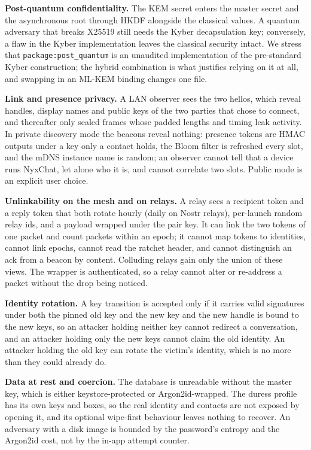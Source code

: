 \documentclass[conference]{IEEEtran}
\begin{document}
\textbf{Post-quantum confidentiality.} The KEM secret enters the master secret and the asynchronous root through HKDF alongside the classical values. A quantum adversary that breaks X25519 still needs the Kyber decapsulation key; conversely, a flaw in the Kyber implementation leaves the classical security intact. We stress that \texttt{package:post\_quantum} is an unaudited implementation of the pre-standard Kyber construction; the hybrid combination is what justifies relying on it at all, and swapping in an ML-KEM binding changes one file.

\textbf{Link and presence privacy.} A LAN observer sees the two hellos, which reveal handles, display names and public keys of the two parties that chose to connect, and thereafter only sealed frames whose padded lengths and timing leak activity. In private discovery mode the beacons reveal nothing: presence tokens are HMAC outputs under a key only a contact holds, the Bloom filter is refreshed every slot, and the mDNS instance name is random; an observer cannot tell that a device runs NyxChat, let alone who it is, and cannot correlate two slots. Public mode is an explicit user choice.

\textbf{Unlinkability on the mesh and on relays.} A relay sees a recipient token and a reply token that both rotate hourly (daily on Nostr relays), per-launch random relay ids, and a payload wrapped under the pair key. It can link the two tokens of one packet and count packets within an epoch; it cannot map tokens to identities, cannot link epochs, cannot read the ratchet header, and cannot distinguish an ack from a beacon by content. Colluding relays gain only the union of these views. The wrapper is authenticated, so a relay cannot alter or re-address a packet without the drop being noticed.

\textbf{Identity rotation.} A key transition is accepted only if it carries valid signatures under both the pinned old key and the new key and the new handle is bound to the new keys, so an attacker holding neither key cannot redirect a conversation, and an attacker holding only the new keys cannot claim the old identity. An attacker holding the old key can rotate the victim's identity, which is no more than they could already do.

\textbf{Data at rest and coercion.} The database is unreadable without the master key, which is either keystore-protected or Argon2id-wrapped. The duress profile has its own keys and boxes, so the real identity and contacts are not exposed by opening it, and its optional wipe-first behaviour leaves nothing to recover. An adversary with a disk image is bounded by the password's entropy and the Argon2id cost, not by the in-app attempt counter.
\end{document}
